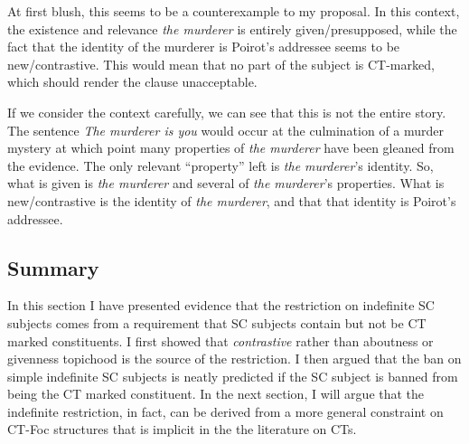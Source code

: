 \documentclass[GPFinal]{subfiles}
\begin{document}
At first blush, this seems to be a counterexample to my proposal.
In this context, the existence and relevance \textit{the murderer} is entirely given/presupposed, while the fact that the identity of the murderer is Poirot's addressee seems to be new/contrastive. 
This would mean that no part of the subject is CT-marked, which should render the clause unacceptable.

If we consider the context carefully, we can see that this is not the entire story.
The sentence \textit{The murderer is you} would occur at the culmination of a murder mystery at which point many properties of \textit{the murderer} have been gleaned from the evidence.
The only relevant ``property'' left is \textit{the murderer}'s identity.
So, what is given is \textit{the murderer} and several of \textit{the murderer}'s properties.
What is new/contrastive is the identity of \textit{the murderer}, and that that identity is Poirot's addressee.

\subsection{Summary}
In this section I have presented evidence that the restriction on indefinite SC subjects comes from a requirement that SC subjects contain but not be CT marked constituents.
I first showed that \textit{contrastive} rather than aboutness or givenness topichood is the source of the restriction.
I then argued that the ban on simple indefinite SC subjects is neatly predicted if the SC subject is banned from being the CT marked constituent.
In the next section, I will argue that the indefinite restriction, in fact, can be derived from a more general constraint on CT-Foc structures that is implicit in the the literature on CTs.
\end{document}
